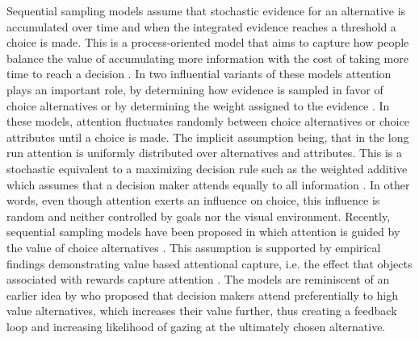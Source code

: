  Sequential sampling models assume that stochastic evidence for an alternative is accumulated over time and when the integrated evidence reaches a threshold a choice is made. This is a process-oriented model that aims to capture how people balance the value of accumulating more information with the cost of taking more time to reach a decision \citep{forstmann2016}. In two influential variants of these models attention plays an important role, by determining how evidence is sampled in favor of choice alternatives \citep{busemeyer1992} or by determining the weight assigned to the evidence \citep{krajbich2010a, thomas2019}. In these models, attention fluctuates randomly between choice alternatives or choice attributes until a choice is made. The implicit assumption being, that in the long run attention is uniformly distributed over alternatives and attributes. This is a stochastic equivalent to a maximizing decision rule such as the weighted additive which assumes that a decision maker attends equally to all information \cite{gloeckner2011a, payne1988}. In other words, even though attention exerts an influence on choice, this influence is random and neither controlled by goals nor the visual environment. Recently, sequential sampling models have been proposed in which attention is guided by the value of choice alternatives \citep{callaway2019a, gluth2018, gluth2020}. This assumption is supported by empirical findings demonstrating value based attentional capture, i.e. the effect that objects associated with rewards capture attention \citep{lepelley2015}. The models are reminiscent of an earlier idea by \cite{shimojo2003a} who proposed that decision makers attend preferentially to high value alternatives, which increases their value further, thus creating a feedback loop and increasing likelihood of gazing at the ultimately chosen alternative.\\ 

